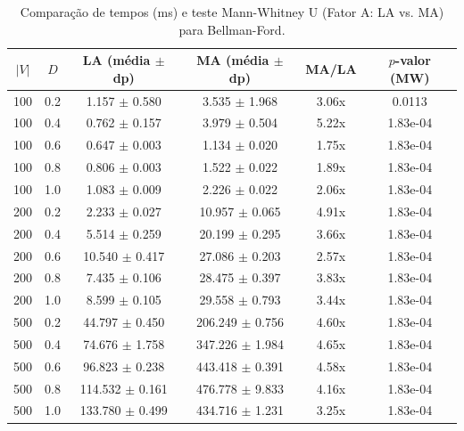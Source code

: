 \begin{table}[htbp]
\centering
\caption{Comparação de tempos (ms) e teste Mann-Whitney U (Fator A: LA vs. MA) para Bellman-Ford.}
\label{tab:fator_a_bellman_ford}
\begin{tabular}{cccccc}
\hline
$|V|$ & $D$ & LA (média $\pm$ dp) & MA (média $\pm$ dp) & MA/LA & $p$-valor (MW) \\
\hline
100 & 0.2 & 1.157 $\pm$ 0.580 & 3.535 $\pm$ 1.968 & 3.06x & 0.0113 \\
100 & 0.4 & 0.762 $\pm$ 0.157 & 3.979 $\pm$ 0.504 & 5.22x & 1.83e-04 \\
100 & 0.6 & 0.647 $\pm$ 0.003 & 1.134 $\pm$ 0.020 & 1.75x & 1.83e-04 \\
100 & 0.8 & 0.806 $\pm$ 0.003 & 1.522 $\pm$ 0.022 & 1.89x & 1.83e-04 \\
100 & 1.0 & 1.083 $\pm$ 0.009 & 2.226 $\pm$ 0.022 & 2.06x & 1.83e-04 \\
200 & 0.2 & 2.233 $\pm$ 0.027 & 10.957 $\pm$ 0.065 & 4.91x & 1.83e-04 \\
200 & 0.4 & 5.514 $\pm$ 0.259 & 20.199 $\pm$ 0.295 & 3.66x & 1.83e-04 \\
200 & 0.6 & 10.540 $\pm$ 0.417 & 27.086 $\pm$ 0.203 & 2.57x & 1.83e-04 \\
200 & 0.8 & 7.435 $\pm$ 0.106 & 28.475 $\pm$ 0.397 & 3.83x & 1.83e-04 \\
200 & 1.0 & 8.599 $\pm$ 0.105 & 29.558 $\pm$ 0.793 & 3.44x & 1.83e-04 \\
500 & 0.2 & 44.797 $\pm$ 0.450 & 206.249 $\pm$ 0.756 & 4.60x & 1.83e-04 \\
500 & 0.4 & 74.676 $\pm$ 1.758 & 347.226 $\pm$ 1.984 & 4.65x & 1.83e-04 \\
500 & 0.6 & 96.823 $\pm$ 0.238 & 443.418 $\pm$ 0.391 & 4.58x & 1.83e-04 \\
500 & 0.8 & 114.532 $\pm$ 0.161 & 476.778 $\pm$ 9.833 & 4.16x & 1.83e-04 \\
500 & 1.0 & 133.780 $\pm$ 0.499 & 434.716 $\pm$ 1.231 & 3.25x & 1.83e-04 \\
\hline
\end{tabular}
\end{table}